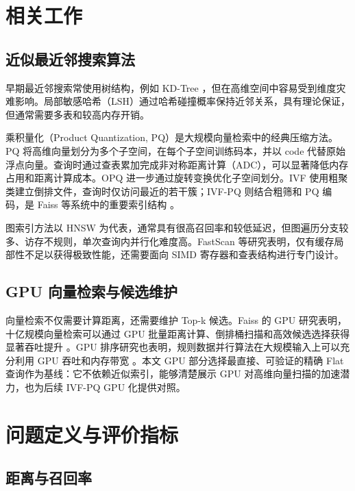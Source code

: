 \documentclass[UTF8,a4paper,10pt]{ctexart}
\begin{document}
\section{相关工作}

\subsection{近似最近邻搜索算法}

早期最近邻搜索常使用树结构，例如 KD-Tree \cite{bentley1975multidimensional}，但在高维空间中容易受到维度灾难影响。局部敏感哈希（LSH）\cite{gionis1999similarity}通过哈希碰撞概率保持近邻关系，具有理论保证，但通常需要多表和较高内存开销。

乘积量化（Product Quantization, PQ）\cite{jegou2010product}是大规模向量检索中的经典压缩方法。PQ 将高维向量划分为多个子空间，在每个子空间训练码本，并以 code 代替原始浮点向量。查询时通过查表累加完成非对称距离计算（ADC），可以显著降低内存占用和距离计算成本。OPQ \cite{ge2013optimized}进一步通过旋转变换优化子空间划分。IVF \cite{sivic2003video}使用粗聚类建立倒排文件，查询时仅访问最近的若干簇；IVF-PQ 则结合粗筛和 PQ 编码，是 Faiss 等系统中的重要索引结构 \cite{johnson2019billion}。

图索引方法以 HNSW \cite{malkov2018efficient}为代表，通常具有很高召回率和较低延迟，但图遍历分支较多、访存不规则，单次查询内并行化难度高。FastScan \cite{andre2016cache}等研究表明，仅有缓存局部性不足以获得极致性能，还需要面向 SIMD 寄存器和查表结构进行专门设计。

\subsection{GPU 向量检索与候选维护}

向量检索不仅需要计算距离，还需要维护 Top-k 候选。Faiss 的 GPU 研究表明，十亿规模向量检索可以通过 GPU 批量距离计算、倒排桶扫描和高效候选选择获得显著吞吐提升 \cite{johnson2019billion}。GPU 排序研究也表明，规则数据并行算法在大规模输入上可以充分利用 GPU 吞吐和内存带宽 \cite{satish2009sorting}。本文 GPU 部分选择最直接、可验证的精确 Flat 查询作为基线：它不依赖近似索引，能够清楚展示 GPU 对高维向量扫描的加速潜力，也为后续 IVF-PQ GPU 化提供对照。

\section{问题定义与评价指标}

\subsection{距离与召回率}
\end{document}
